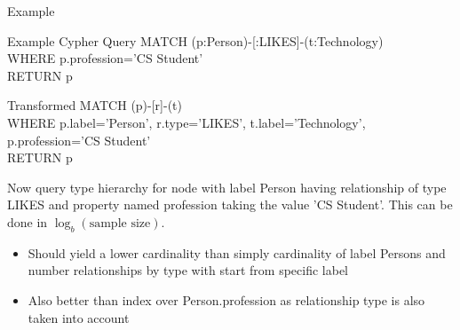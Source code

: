 \documentclass[rgb]{beamer}
\begin{document}
    \begin{frame}[allowframebreaks]{Example}
        \begin{exampleblock}{Example Cypher Query}
            MATCH (p:Person)-[:LIKES]-(t:Technology) \\
            WHERE p.profession='CS Student' \\
            RETURN p
        \end{exampleblock}
        
        \begin{exampleblock}{Transformed}
            MATCH (p)-[r]-(t) \\
            WHERE p.label='Person', r.type='LIKES', t.label='Technology', p.profession='CS Student' \\
            RETURN p
        \end{exampleblock}
        Now query type hierarchy for node with label Person having relationship of type LIKES and property named profession taking the value 'CS Student'. This can be done in $\log_b (\text{sample size})$.  \\
        \vspace{1cm}
        \begin{itemize}
            \item Should yield a lower cardinality than simply cardinality of label Persons and number relationships by type with start from specific label
            \item Also better than index over Person.profession as relationship type is also taken into account
        \end{itemize}
    \end{frame}
\end{document}
